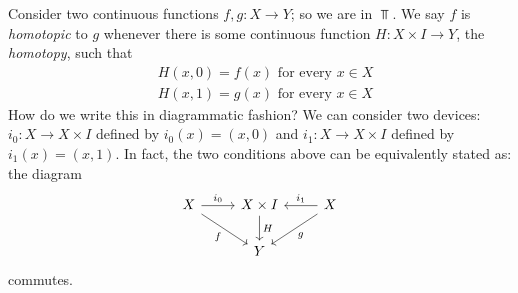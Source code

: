 \begin{example}[Homotopy]
  Consider two continuous functions \(f, g : X \to Y\); so we are in
  \(\Top\). We say \(f\) is {\em homotopic} to \(g\) whenever there is
  some continuous function \(H : X \times I \to Y\), the {\em homotopy}, such
  that
  \begin{align*}
    & H(x, 0) = f(x) \text{ for every } x \in X \\
    & H(x, 1) = g(x) \text{ for every } x \in X
  \end{align*}
  How do we write this in diagrammatic fashion? We can consider two
  devices: \(i_0 : X \to X \times I\) defined by \(i_0(x) = (x, 0)\) and
  \(i_1 : X \to X \times I\) defined by \(i_1(x) = (x, 1)\). In fact, the two
  conditions above can be equivalently stated as: the diagram
  \[
    \begin{tikzcd}
      X \ar["{i_0}", r] \ar["f", dr, swap] & X \times I \ar["H", d] & X
      \ar["{i_1}", l,
      swap] \ar["g", dl] \\
      & Y
    \end{tikzcd}
  \]
  commutes.
\end{example}


